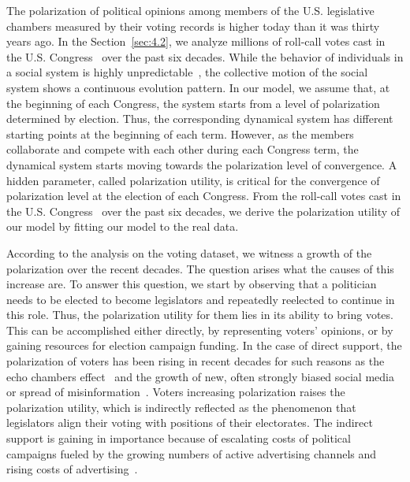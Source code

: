 The polarization of political opinions among members of the U.S. legislative chambers measured by their voting records is higher today than it was thirty years ago. In the Section~\ref{sec:4.2}, we analyze millions of roll-call votes cast in the U.S. Congress~\cite{lewis2018voteview} over the past six decades. While the behavior of individuals in a social system is highly unpredictable~\cite{jurdak2015understanding,song2010limits}, the collective motion of the social system shows a continuous evolution pattern. In our model, we assume that, at the beginning of each Congress, the system starts from a level of polarization determined by election. Thus, the corresponding dynamical system has different starting points at the beginning of each term. However, as the members collaborate and compete with each other during each Congress term, the dynamical system starts moving towards the polarization level of convergence. A hidden parameter, called polarization utility, is critical for the convergence of polarization level at the election of each Congress. From the roll-call votes cast in the U.S. Congress~\cite{lewis2018voteview} over the past six decades, we derive the polarization utility of our model by fitting our model to the real data.

According to the analysis on the voting dataset, we witness a growth of the polarization over the recent decades. The question arises what the causes of this increase are. To answer this question, we start by observing that a politician needs to be elected to become legislators and repeatedly reelected to continue in this role. Thus, the polarization utility for them lies in its ability to bring votes. This can be accomplished either directly, by representing voters' opinions, or by gaining resources for election campaign funding. In the case of direct support, the polarization of voters has been rising in recent decades for such reasons as the echo chambers effect~\cite{garrett2009echo, madsen2018large} and the growth of new, often strongly biased social media~\cite{garimella2018polarization} or spread of misinformation~\cite{jin2014misinformation, allcott2017social}. Voters increasing polarization raises the polarization utility, which is indirectly reflected as the phenomenon that legislators align their voting with positions of their electorates. The indirect support is gaining in importance because of escalating costs of political campaigns fueled by the growing numbers of active advertising channels and rising costs of advertising~\cite{ansolabehere2001corruption}. 

